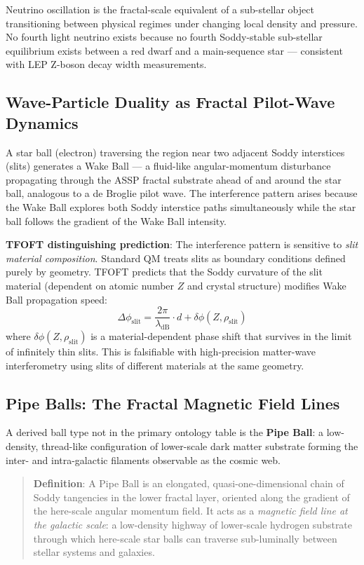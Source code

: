 \documentclass[11pt,a4paper]{article}
\begin{document}
Neutrino oscillation is the fractal-scale equivalent of a sub-stellar object
transitioning between physical regimes under changing local density and pressure.
No fourth light neutrino exists because no fourth Soddy-stable sub-stellar
equilibrium exists between a red dwarf and a main-sequence star --- consistent with
LEP Z-boson decay width measurements.

\subsection{Wave-Particle Duality as Fractal Pilot-Wave Dynamics}

A star ball (electron) traversing the region near two adjacent Soddy interstices
(slits) generates a Wake Ball --- a fluid-like angular-momentum disturbance
propagating through the ASSP fractal substrate ahead of and around the star ball,
analogous to a de Broglie pilot wave. The interference pattern arises because the
Wake Ball explores both Soddy interstice paths simultaneously while the star ball
follows the gradient of the Wake Ball intensity.

\textbf{TFOFT distinguishing prediction}: The interference pattern is sensitive to
\emph{slit material composition}. Standard QM treats slits as boundary conditions
defined purely by geometry. TFOFT predicts that the Soddy curvature of the slit
material (dependent on atomic number $Z$ and crystal structure) modifies Wake Ball
propagation speed:
\begin{equation}
  \Delta\phi_{\text{slit}} = \frac{2\pi}{\lambda_{\text{dB}}} \cdot d
    + \delta\phi(Z, \rho_{\text{slit}})
  \label{eq:slit_material}
\end{equation}
where $\delta\phi(Z, \rho_{\text{slit}})$ is a material-dependent phase shift that
survives in the limit of infinitely thin slits. This is falsifiable with
high-precision matter-wave interferometry using slits of different materials at the
same geometry.

\subsection{Pipe Balls: The Fractal Magnetic Field Lines}

A derived ball type not in the primary ontology table is the \textbf{Pipe Ball}: a
low-density, thread-like configuration of lower-scale dark matter substrate forming
the inter- and intra-galactic filaments observable as the cosmic web.

\begin{quote}
\textbf{Definition}: A Pipe Ball is an elongated, quasi-one-dimensional chain of
Soddy tangencies in the lower fractal layer, oriented along the gradient of the
here-scale angular momentum field. It acts as a \emph{magnetic field line at the
galactic scale}: a low-density highway of lower-scale hydrogen substrate through
which here-scale star balls can traverse sub-luminally between stellar systems
and galaxies.
\end{quote}
\end{document}
